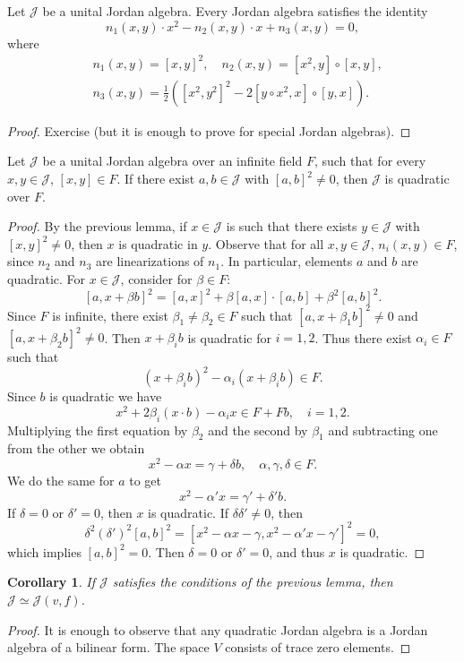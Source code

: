 \documentclass{article}
\newtheorem{corollary}[theorem]{Corollary}
\begin{document}
\begin{lemma}
Let $\mathcal{J}$ be a unital Jordan algebra. Every Jordan algebra satisfies the identity
\[
n_1(x,y)\cdot x^2 - n_2(x,y)\cdot x + n_3(x,y)=0,
\]
where
\begin{align*}
& n_1(x,y)=[x,y]^2, \quad n_2(x,y)=[x^2,y]\circ[x,y], \\
& n_3(x,y)=\frac{1}{2}\left([x^2,y^2]^2 - 2[y\circ x^2,x]\circ[y,x]\right).
\end{align*}
\end{lemma}
\begin{proof}
Exercise (but it is enough to prove for special Jordan algebras).
\end{proof}

\begin{lemma}
Let $\mathcal{J}$ be a unital Jordan algebra over an infinite field $F$, such that for every $x,y \in \mathcal{J}$, $[x,y] \in F$. If there exist $a,b \in \mathcal{J}$ with $[a,b]^2 \neq 0$, then $\mathcal{J}$ is quadratic over $F$.
\end{lemma}
\begin{proof}
By the previous lemma, if $x \in \mathcal{J}$ is such that there exists $y \in \mathcal{J}$ with $[x,y]^2 \neq 0$, then $x$ is quadratic in $y$. Observe that for all $x,y \in \mathcal{J}$, $n_i(x,y) \in F$, since $n_2$ and $n_3$ are linearizations of $n_1$. In particular, elements $a$ and $b$ are quadratic. For $x \in \mathcal{J}$, consider for $\beta \in F$:
\[
[a,x+\beta b]^2 = [a,x]^2 + \beta[a,x]\cdot[a,b] + \beta^2[a,b]^2.
\]
Since $F$ is infinite, there exist $\beta_1 \neq \beta_2 \in F$ such that $[a,x+\beta_1 b]^2 \neq 0$ and $[a,x+\beta_2 b]^2 \neq 0$. Then $x+\beta_i b$ is quadratic for $i=1,2$. Thus there exist $\alpha_i \in F$ such that
\[
(x+\beta_i b)^2 - \alpha_i(x+\beta_i b) \in F.
\]
Since $b$ is quadratic we have
\[
x^2 + 2\beta_i(x \cdot b) - \alpha_i x \in F + F b, \quad i=1,2.
\]
Multiplying the first equation by $\beta_2$ and the second by $\beta_1$ and subtracting one from the other we obtain
\[
x^2 - \alpha x = \gamma + \delta b, \quad \alpha,\gamma,\delta \in F.
\]
We do the same for $a$ to get
\[
x^2 - \alpha' x = \gamma' + \delta' b.
\]
If $\delta=0$ or $\delta'=0$, then $x$ is quadratic. If $\delta\delta' \neq 0$, then
\[
\delta^2(\delta')^2[a,b]^2 = [x^2-\alpha x-\gamma, x^2-\alpha' x-\gamma']^2 = 0,
\]
which implies $[a,b]^2=0$. Then $\delta=0$ or $\delta'=0$, and thus $x$ is quadratic.
\end{proof}

\begin{corollary}
If $\mathcal{J}$ satisfies the conditions of the previous lemma, then $\mathcal{J} \simeq \mathcal{J}(v,f)$.
\end{corollary}
\begin{proof}
It is enough to observe that any quadratic Jordan algebra is a Jordan algebra of a bilinear form. The space $V$ consists of trace zero elements.
\end{proof}
\end{document}
